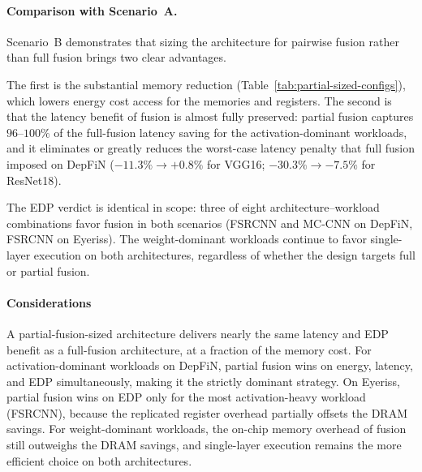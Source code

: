 \paragraph{Comparison with Scenario~A.}
Scenario~B demonstrates that sizing the architecture for pairwise
fusion rather than full fusion brings two clear advantages.

The first is the substantial memory reduction
(Table~\ref{tab:partial-sized-configs}), which lowers energy cost access for the memories and registers.
The second is that the latency benefit of fusion is almost fully
preserved: partial fusion captures $96$--$100\%$ of the
full-fusion latency saving for the activation-dominant workloads,
and it eliminates or greatly reduces the worst-case latency
penalty that full fusion imposed on DepFiN
($-11.3\%{\to}+0.8\%$ for VGG16; $-30.3\%{\to}-7.5\%$ for
ResNet18).


The EDP verdict is identical in scope: three of eight
architecture--workload combinations favor fusion in both
scenarios (FSRCNN and MC-CNN on DepFiN, FSRCNN on Eyeriss).
The weight-dominant workloads continue to favor single-layer
execution on both architectures, regardless of whether the
design targets full or partial fusion.

\paragraph{Considerations}
A partial-fusion-sized architecture delivers nearly the same
latency and EDP benefit as a full-fusion architecture, at a
fraction of the memory cost.
For activation-dominant workloads on DepFiN, partial fusion
wins on energy, latency, and EDP simultaneously, making it
the strictly dominant strategy.
On Eyeriss, partial fusion wins on EDP only for the most
activation-heavy workload (FSRCNN), because the replicated
register overhead partially offsets the DRAM savings.
For weight-dominant workloads, the on-chip memory overhead of
fusion still outweighs the DRAM savings,
and single-layer execution remains the more efficient choice
on both architectures.
